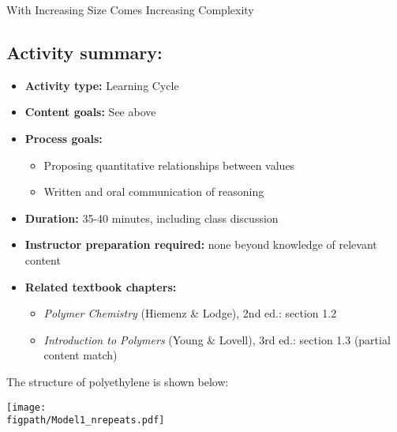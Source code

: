 \begin{activity}{With Increasing Size Comes Increasing Complexity}
\begin{instructornotes}
	\subsection*{Activity summary:}
	\begin{itemize}
		\item \textbf{Activity type:} Learning Cycle
		\item \textbf{Content goals:} See above
		\item \textbf{Process goals:} %
			\begin{itemize}
				\item Proposing quantitative relationships between values
				\item Written and oral communication of reasoning
			\end{itemize}
		\item \textbf{Duration:} 35-40 minutes, including class discussion
		\item \textbf{Instructor preparation required:} none beyond knowledge of relevant content
		\item \textbf{Related textbook chapters:}
			\begin{itemize}
				\item \emph{Polymer Chemistry} (Hiemenz \& Lodge), 2nd ed.: section 1.2
				\item \emph{Introduction to Polymers} (Young \& Lovell), 3rd ed.: section 1.3 (partial content match)
			\end{itemize}
	\end{itemize}
	
\end{instructornotes}




\begin{model}
\label{\labelbase:mdl:polyethyleneMW}

	The structure of polyethylene is shown below:

	\vspace{6pt}
	\centerline{\texttt{[image: \\figpath/Model1\_nrepeats.pdf]}}
	\vspace{6pt}
	

\end{model}
\end{activity}
